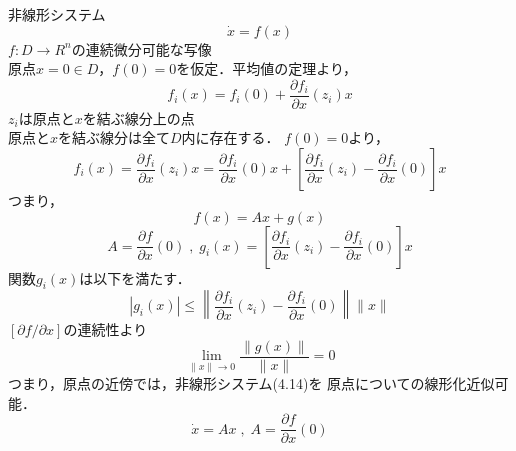 \documentclass{jsarticle}
\begin{document}
{\color{gray}\hrulefill}

非線形システム
\begin{equation*}
  \dot x = f(x) \tag{4.14}
\end{equation*}
$f:D\rightarrow R^n$の連続微分可能な写像\\
原点$x=0\in D$，$f(0)=0$を仮定．平均値の定理より，
\begin{equation*}
  f_i(x) = f_i(0)+\frac{\partial f_i}{\partial x}(z_i)x
\end{equation*}
$z_i$は原点と$x$を結ぶ線分上の点\\
原点と$x$を結ぶ線分は全て$D$内に存在する．
$f(0)=0$より，
\begin{equation*}
  f_i(x) = \frac{\partial f_i}{\partial x}(z_i)x 
  = \frac{\partial f_i}{\partial x}(0)x +
  \left[\frac{\partial f_i}{\partial x}(z_i)-\frac{\partial f_i}{\partial x}(0)\right]x
\end{equation*}
つまり，
\begin{equation*}
  f(x)=Ax + g(x)
\end{equation*}
\begin{equation*}
  A = \frac{\partial f}{\partial x}(0)\;,\;g_i(x)=\left[\frac{\partial f_i}{\partial x}(z_i)-\frac{\partial f_i}{\partial x}(0)\right]x
\end{equation*}
関数$g_i(x)$は以下を満たす．
\begin{equation*}
  |g_i(x)|\leq \left\|\frac{\partial f_i}{\partial x}(z_i)-\frac{\partial f_i}{\partial x}(0)\right\|\|x\|
\end{equation*}
$[\partial f/\partial x]$の連続性より
\begin{equation*}
  \lim_{\|x\|\rightarrow 0} \frac{\|g(x)\|}{\|x\|} = 0
\end{equation*}
つまり，原点の近傍では，非線形システム(4.14)を
原点についての線形化近似可能．
\begin{equation*}
  \dot x = Ax\;,\; A = \frac{\partial f}{\partial x}(0)
\end{equation*}

{\color{gray}\hrulefill}
\end{document}

